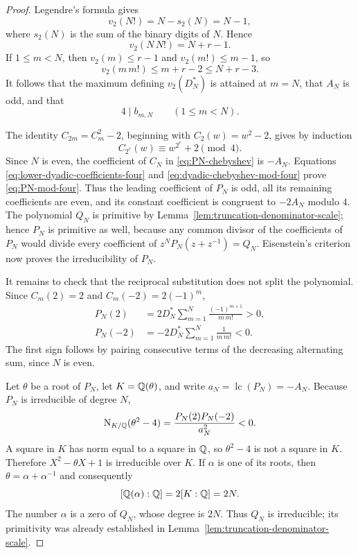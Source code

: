 \begin{proof}
Legendre's formula gives
\[
 v_2(N!)=N-s_2(N)=N-1,
\]
where \(s_2(N)\) is the sum of the binary digits of \(N\).  Hence
\begin{equation}\label{eq:dyadic-top-valuation}
 v_2(N\,N!)=N+r-1.
\end{equation}
If \(1\leq m<N\), then \(v_2(m)\leq r-1\) and
\(v_2(m!)\leq m-1\), so
\[
 v_2(m\,m!)\leq m+r-2\leq N+r-3.
\]
It follows that the maximum defining \(v_2(D_N^*)\) is attained at
\(m=N\), that \(A_N\) is odd, and that
\begin{equation}\label{eq:lower-dyadic-coefficients-four}
 4\mid b_{m,N}\qquad(1\leq m<N).
\end{equation}

The identity \(C_{2m}=C_m^2-2\), beginning with
\(C_2(w)=w^2-2\), gives by induction
\begin{equation}\label{eq:dyadic-chebyshev-mod-four}
 C_{2^r}(w)\equiv w^{2^r}+2\pmod4.
\end{equation}
Since \(N\) is even, the coefficient of \(C_N\) in
\eqref{eq:PN-chebyshev} is \(-A_N\).  Equations
\eqref{eq:lower-dyadic-coefficients-four} and
\eqref{eq:dyadic-chebyshev-mod-four} prove
\eqref{eq:PN-mod-four}.  Thus the leading coefficient of \(P_N\) is odd,
all its remaining coefficients are even, and its constant coefficient is
congruent to \(-2A_N\) modulo \(4\).  The polynomial \(Q_N\) is primitive
by Lemma~\ref{lem:truncation-denominator-scale}; hence \(P_N\) is
primitive as well, because any common divisor of the coefficients of
\(P_N\) would divide every coefficient of \(z^NP_N(z+z^{-1})=Q_N\).
Eisenstein's criterion now proves the irreducibility of \(P_N\).

It remains to check that the reciprocal substitution does not split the
polynomial.  Since \(C_m(2)=2\) and \(C_m(-2)=2(-1)^m\),
\begin{align}
 P_N(2)
 &=2D_N^*\sum_{m=1}^N\frac{(-1)^{m+1}}{m\,m!}>0,
 \label{eq:PN-at-two-positive}\\
 P_N(-2)
 &=-2D_N^*\sum_{m=1}^N\frac{1}{m\,m!}<0.
 \label{eq:PN-at-minus-two-negative}
\end{align}
The first sign follows by pairing consecutive terms of the decreasing
alternating sum, since \(N\) is even.

Let \(\theta\) be a root of \(P_N\), let
\(K=\mathbb Q(\theta)\), and write \(a_N=\operatorname{lc}(P_N)=-A_N\).
Because \(P_N\) is irreducible of degree \(N\),
\begin{equation}\label{eq:dyadic-discriminant-norm}
 \operatorname N_{K/\mathbb Q}(\theta^2-4)
 =\frac{P_N(2)P_N(-2)}{a_N^2}<0.
\end{equation}
A square in \(K\) has norm equal to a square in \(\mathbb Q\), so
\(\theta^2-4\) is not a square in \(K\).  Therefore
\(X^2-\theta X+1\) is irreducible over \(K\).  If \(\alpha\) is one of
its roots, then \(\theta=\alpha+\alpha^{-1}\) and consequently
\[
 [\mathbb Q(\alpha):\mathbb Q]
 =2[K:\mathbb Q]=2N.
\]
The number \(\alpha\) is a zero of \(Q_N\), whose degree is \(2N\).
Thus \(Q_N\) is irreducible; its primitivity was already established in
Lemma~\ref{lem:truncation-denominator-scale}.
\end{proof}

